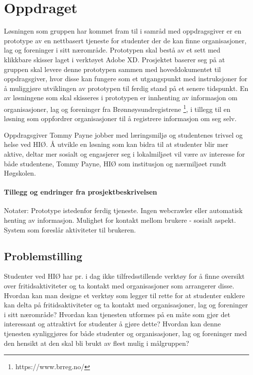 \section{Oppdraget}
Løsningen som gruppen har kommet fram til i samråd med oppdragsgiver er en prototype av en nettbasert tjeneste for studenter der de kan finne organisasjoner, lag og foreninger i sitt nærområde. Prototypen skal bestå av et sett med klikkbare skisser laget i verktøyet Adobe XD. Prosjektet baserer seg på at gruppen skal levere denne prototypen sammen med hoveddokumentet til oppdragsgiver, hvor disse kan fungere som et utgangspunkt med instruksjoner for å muliggjøre utviklingen av prototypen til ferdig stand på et senere tidspunkt. En av løsningene som skal skisseres i prototypen er innhenting av informasjon om organisasjoner, lag og foreninger fra Brønnøysundregistrene \footnote{https://www.brreg.no/}, i tillegg til en løsning som oppfordrer organisasjoner til å registrere informasjon om seg selv.

Oppdragsgiver Tommy Payne jobber med læringsmiljø og studentenes trivsel og helse ved HIØ. Å utvikle en løsning som kan bidra til at studenter blir mer aktive, deltar mer sosialt og engasjerer seg i lokalmiljøet vil være av interesse for både studentene, Tommy Payne, HIØ som institusjon og nærmiljøet rundt Høgskolen.

\paragraph{Tillegg og endringer fra prosjektbeskrivelsen}
Notater:
Prototype istedenfor ferdig tjeneste.
Ingen webcrawler eller automatisk henting av informasjon.
Mulighet for kontakt mellom brukere - sosialt aspekt.
System som foreslår aktiviteter til brukeren.

\subsection{Problemstilling}
Studenter ved HIØ har pr. i dag ikke tilfredsstillende verktøy for å finne oversikt over fritidsaktiviteter og ta kontakt med organisasjoner som arrangerer disse. Hvordan kan man designe et verktøy som legger til rette for at studenter enklere kan delta på fritidsaktiviteter og ta kontakt med organisasjoner, lag og foreninger i sitt nærområde? Hvordan kan tjenesten utformes på en måte som gjør det interessant og attraktivt for studenter å gjøre dette? Hvordan kan denne tjenesten synliggjøres for både studenter og organisasjoner, lag og foreninger med den hensikt at den skal bli brukt av flest mulig i målgruppen?

